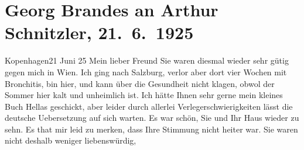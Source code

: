 

         
         \newcommand{\erwaehntePersonen}{Personen:  ?? [Kusine von Gertrud Rung], Gertrud Rung, Otto Rung}
         \newcommand{\erwaehnteInstitutionen}{Institutionen: Akademie der Wissenschaften}
         \newcommand{\erwaehnteOrte}{Orte: Burgtheater, Italien, Kopenhagen, Moskau, Russland, Salzburg, Sankt Petersburg, Wien}
         \newcommand{\erwaehnteWerke}{Werke: Der Schleier der Beatrice. Schauspiel in fünf Akten, Hellas}
               \section[Georg Brandes an Arthur Schnitzler, 21. 6. 1925]{ Georg Brandes an Arthur Schnitzler, 21. 6. 1925}\nopagebreak{}\rehead{ }\begin{ledgroupsized}[t]{13cm}\normalsize\beginnumbering \toendnotes[C]{\smallbreak\pagebreak[2]} 
\toendnotes[C]{\smallbreak}\pstart
           \raggedleft{}{\pb}Kopenhagen21 Juni 25\pend
           \pstart{}Mein lieber Freund\pend\pstart
           Sie waren diesmal wieder sehr gütig gegen mich in Wien. Ich ging nach Salzburg, verlor
                    aber dort vier Wochen mit Bronchitis, bin hier, und kann über die Gesundheit
                    nicht klagen, obwol der Sommer hier kalt und unheimlich ist.\pend
           \pstart
           Ich hätte Ihnen sehr gerne mein kleines Buch Hellas geschickt, aber leider durch allerlei Verlegerschwierigkeiten
                    lässt die deutsche Uebersetzung auf sich warten.\pend
           \pstart
           Es war schön, Sie und Ihr Haus wieder zu sehn. Es that mir leid zu merken, dass
                    Ihre Stimmung nicht heiter war. Sie waren nicht deshalb weniger liebenswürdig,

\end{ledgroupsized}

